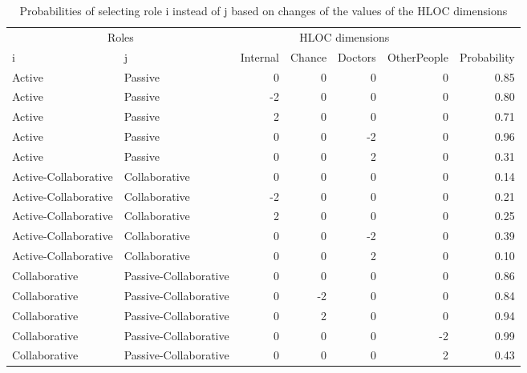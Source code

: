 \documentclass[
]{book}
\begin{document}
\begin{table}

\caption{\label{tab:unnamed-chunk-105}Probabilities of selecting role i instead of j based on changes of the values of the HLOC dimensions}
\centering
\begin{tabular}[t]{llrrrrr}
\toprule
\multicolumn{2}{c}{Roles} & \multicolumn{4}{c}{HLOC dimensions} & \multicolumn{1}{c}{ } \\
\cmidrule(l{3pt}r{3pt}){1-2} \cmidrule(l{3pt}r{3pt}){3-6}
i & j & Internal & Chance & Doctors & OtherPeople & Probability\\
\midrule
Active & Passive & 0 & 0 & 0 & 0 & 0.85\\
Active & Passive & -2 & 0 & 0 & 0 & 0.80\\
Active & Passive & 2 & 0 & 0 & 0 & 0.71\\
Active & Passive & 0 & 0 & -2 & 0 & 0.96\\
Active & Passive & 0 & 0 & 2 & 0 & 0.31\\
\addlinespace
Active-Collaborative & Collaborative & 0 & 0 & 0 & 0 & 0.14\\
Active-Collaborative & Collaborative & -2 & 0 & 0 & 0 & 0.21\\
Active-Collaborative & Collaborative & 2 & 0 & 0 & 0 & 0.25\\
Active-Collaborative & Collaborative & 0 & 0 & -2 & 0 & 0.39\\
Active-Collaborative & Collaborative & 0 & 0 & 2 & 0 & 0.10\\
\addlinespace
Collaborative & Passive-Collaborative & 0 & 0 & 0 & 0 & 0.86\\
Collaborative & Passive-Collaborative & 0 & -2 & 0 & 0 & 0.84\\
Collaborative & Passive-Collaborative & 0 & 2 & 0 & 0 & 0.94\\
Collaborative & Passive-Collaborative & 0 & 0 & 0 & -2 & 0.99\\
Collaborative & Passive-Collaborative & 0 & 0 & 0 & 2 & 0.43\\
\bottomrule
\end{tabular}
\end{table}

  
\end{document}
